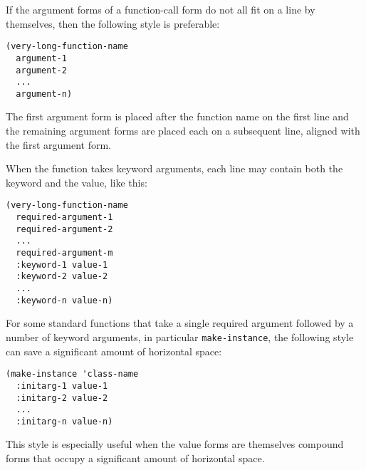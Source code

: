 If the argument forms of a function-call form do not all fit on a line
by themselves, then the following style is preferable:

\begin{verbatim}
(very-long-function-name
  argument-1
  argument-2
  ...
  argument-n)
\end{verbatim}

The first argument form is placed after the function name on the first
line and the remaining argument forms are placed each on a subsequent
line, aligned with the first argument form.

When the function takes keyword arguments, each line may contain both
the keyword and the value, like this:

\begin{verbatim}
(very-long-function-name
  required-argument-1
  required-argument-2
  ...
  required-argument-m
  :keyword-1 value-1
  :keyword-2 value-2
  ...
  :keyword-n value-n)
\end{verbatim}

For some standard functions that take a single required argument
followed by a number of keyword arguments, in particular
\texttt{make-instance}, the following style can save a significant
amount of horizontal space:

\begin{verbatim}
(make-instance 'class-name
  :initarg-1 value-1
  :initarg-2 value-2
  ...
  :initarg-n value-n)
\end{verbatim}

This style is especially useful when the value forms are themselves
compound forms that occupy a significant amount of horizontal space.

